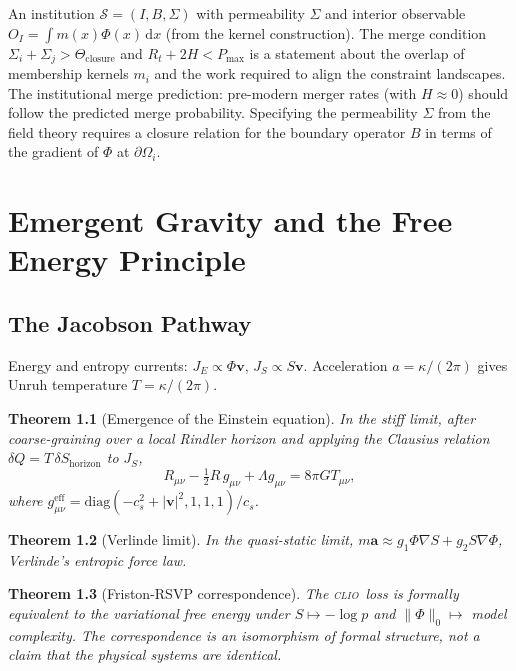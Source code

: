 \documentclass[12pt, oneside]{book}
\theoremstyle{plain}
\newtheorem{theorem}{Theorem}[chapter]
\theoremstyle{definition}
\newcommand{\vfield}{\mathbf{v}}
\newcommand{\CLIO}{\textsc{clio}}
\newcommand{\dd}{\mathrm{d}}
\newcommand{\nab}{\nabla}
\begin{document}
An institution $\mathcal{S} = (I, B, \Sigma)$ with permeability $\Sigma$ and
interior observable $O_I = \int m(x)\Phi(x)\, \dd x$ (from the kernel construction).
The merge condition $\Sigma_i + \Sigma_j > \Theta_{\mathrm{closure}}$ and
$R_t + 2H < P_{\max}$ is a statement about the overlap of membership kernels $m_i$
and the work required to align the constraint landscapes. The institutional merge
prediction: pre-modern merger rates (with $H\approx 0$) should follow the predicted
merge probability. Specifying the permeability $\Sigma$ from the field theory requires
a closure relation for the boundary operator $B$ in terms of the gradient of $\Phi$
at $\partial\Omega_i$.

\chapter{Emergent Gravity and the Free Energy Principle}
\label{ch:gravity}

\section{The Jacobson Pathway}
\label{sec:jacobson}

Energy and entropy currents: $J_E\propto\Phi\vfield$, $J_S\propto S\vfield$.
Acceleration $a=\kappa/(2\pi)$ gives Unruh temperature $T=\kappa/(2\pi)$.

\begin{theorem}[Emergence of the Einstein equation]
In the stiff limit, after coarse-graining over a local Rindler horizon and applying
the Clausius relation $\delta Q = T\,\delta S_{\mathrm{horizon}}$ to $J_S$,
\[
  R_{\mu\nu} - \tfrac{1}{2}R\,g_{\mu\nu} + \Lambda g_{\mu\nu} = 8\pi G T_{\mu\nu},
\]
where $g^{\mathrm{eff}}_{\mu\nu} = \mathrm{diag}(-c_s^2+|\vfield|^2,1,1,1)/c_s$.
\end{theorem}

\begin{theorem}[Verlinde limit]
In the quasi-static limit, $m\mathbf{a}\approx g_1\Phi\nab S + g_2 S\nab\Phi$,
Verlinde's entropic force law.
\end{theorem}

\begin{theorem}[Friston-RSVP correspondence]
The \CLIO\ loss is formally equivalent to the variational free energy under
$S\mapsto -\log p$ and $\|\Phi\|_0\mapsto$ model complexity. The correspondence
is an isomorphism of formal structure, not a claim that the physical systems are
identical.
\end{theorem}
\end{document}
